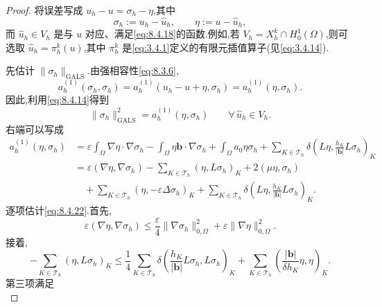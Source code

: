 \begin{proof}
将误差写成 \(u_h-u=\sigma_h-\eta\),其中
\begin{equation}\label{eq:8.4.20}
  \sigma_h:=u_h-\widehat u_h,\qquad \eta:=u-\widehat u_h,
\end{equation}
而 \(\widehat u_h\in V_h\) 是与 \(u\) 对应、满足\eqref{eq:8.4.18}的函数.例如,若 \(V_h=X_h^k\cap H_0^1(\Omega)\),则可选取 \(\widehat u_h=\pi_h^k(u)\),其中 \(\pi_h^k\) 是\eqref{eq:3.4.1}定义的有限元插值算子(见\eqref{eq:3.4.14}).

先估计 \(\|\sigma_h\|_{\mathrm{GALS}}\).由强相容性\eqref{eq:8.3.6},
\[
  a_h^{(1)}(\sigma_h,\sigma_h)
     =a_h^{(1)}(u_h-u+\eta,\sigma_h)=a_h^{(1)}(\eta,\sigma_h).
\]
因此,利用\eqref{eq:8.4.14}得到
\begin{equation}\label{eq:8.4.21}
  \|\sigma_h\|_{\mathrm{GALS}}^2=a_h^{(1)}(\eta,\sigma_h)
       \qquad\forall\,\widehat u_h\in V_h.
\end{equation}
右端可以写成
\begin{equation}\label{eq:8.4.22}
  \begin{aligned}
    a_h^{(1)}(\eta,\sigma_h)
     &=\varepsilon\int_\Omega\nabla\eta\cdot\nabla\sigma_h
       -\int_\Omega\eta\boldsymbol{b}\cdot\nabla\sigma_h+\int_\Omega a_0\eta\sigma_h
       +\sum_{K\in\mathcal T_h}\delta\left(L\eta,\frac{h_K}{|\boldsymbol{b}|}L\sigma_h\right)_K\\
     &=\varepsilon(\nabla\eta,\nabla\sigma_h)
       -\sum_{K\in\mathcal T_h}(\eta,L\sigma_h)_K+2(\mu\eta,\sigma_h)\\
     &\quad+\sum_{K\in\mathcal T_h}(\eta,-\varepsilon\Delta\sigma_h)_K
       +\sum_{K\in\mathcal T_h}\delta\left(L\eta,\frac{h_K}{|\boldsymbol{b}|}L\sigma_h\right)_K .
  \end{aligned}
\end{equation}
逐项估计\eqref{eq:8.4.22}.首先,
\begin{equation}\label{eq:8.4.23}
  \varepsilon(\nabla\eta,\nabla\sigma_h)
     \le\frac\varepsilon4\|\nabla\sigma_h\|_{0,\Omega}^2
           +\varepsilon\|\nabla\eta\|_{0,\Omega}^2.
\end{equation}
接着,
\begin{equation}\label{eq:8.4.24}
  -\sum_{K\in\mathcal T_h}(\eta,L\sigma_h)_K
    \le\frac14\sum_{K\in\mathcal T_h}\delta
         \left(\frac{h_K}{|\boldsymbol{b}|}L\sigma_h,L\sigma_h\right)_K
        +\sum_{K\in\mathcal T_h}\left(\frac{|\boldsymbol{b}|}{\delta h_K}\eta,\eta\right)_K.
\end{equation}
第三项满足
\begin{equation}\label{eq:8.4.25}

\end{equation}
\end{proof}
